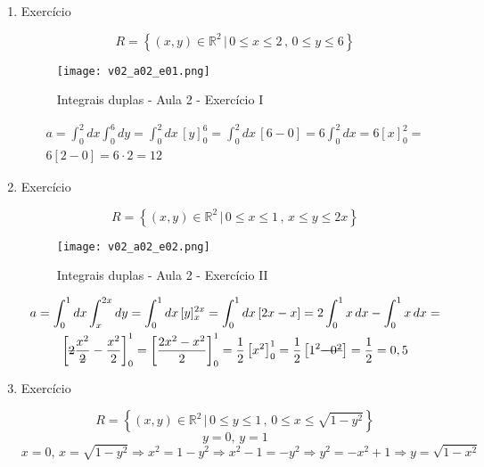 \begin{enumerate}
	\item Exercício
	
	\begin{equation*}
		R = \left\{(x, y) \in \mathbb{R}^2 \,|\, 0 \leq x \leq 2 \,,\, 0 \leq y \leq 6 \right\}	
	\end{equation*}
	
	\begin{figure}[htb]
		\caption{Integrais duplas - Aula 2 - Exercício I}
		\label{v02_a02_e01}
		\centering
		\texttt{[image: v02\_a02\_e01.png]}		
	\end{figure}
	
	\begin{gather*}
		a = \int_0^2 dx \int_0^6 dy = \int_0^2 dx\, [y]_0^6 = \int_0^2 dx\, [6 - 0] = 6\int_0^2 dx = 6[x]_0^2 =\\ 6[2 - 0] = 6 \cdot 2 = 12
	\end{gather*}
		
	\item Exercício
	
	\begin{equation*}
		R = \left\{(x, y) \in \mathbb{R}^2 \,|\, 0 \leq x \leq 1 \,,\, x \leq y \leq 2x \right\}
	\end{equation*}
							
	\begin{figure}[htb]
		\caption{Integrais duplas - Aula 2 - Exercício II}
		\label{v02_a02_e02}
		\centering
		\texttt{[image: v02\_a02\_e02.png]}		
	\end{figure}
	
	\begin{gather*}
		a = \int_0^1 dx \int_{x}^{2x} dy = \int_0^1 dx\, [y]_{x}^{2x} = \int_0^1 dx\, [2x - x] = 2\int_0^1 x\, dx - \int_0^1 x\, dx =\\ \left[\overstrike{2}\dfrac{x^2}{\overstrike{2}} - \dfrac{x^2}{2}\right]_0^1 = \left[\dfrac{2x^2 - x^2}{2}\right]_0^1 = \dfrac{1}{2}\left[x^2\right]_0^1 = \dfrac{1}{2}\left[1^2 \overstrike{- 0^2}\right] = \dfrac{1}{2} = 0,5
	\end{gather*}
		
	\item Exercício
	
	\begin{equation*}
		R = \left\{(x, y) \in \mathbb{R}^2 \,|\, 0 \leq y \leq 1 \,,\, 0 \leq x \leq \sqrt{1 - y^2} \right\}
	\end{equation*}
	\begin{equation*}
		y = 0,\, y = 1
	\end{equation*}
	\begin{equation*}
		x = 0,\, x = \sqrt{1 - y^2} \Rightarrow x^2 = 1 - y^2 \Rightarrow x^2 - 1 = -y^2 \Rightarrow y^2 = -x^2 + 1 \Rightarrow y = \sqrt{1 -x^2}
	\end{equation*}
					

\end{enumerate}
